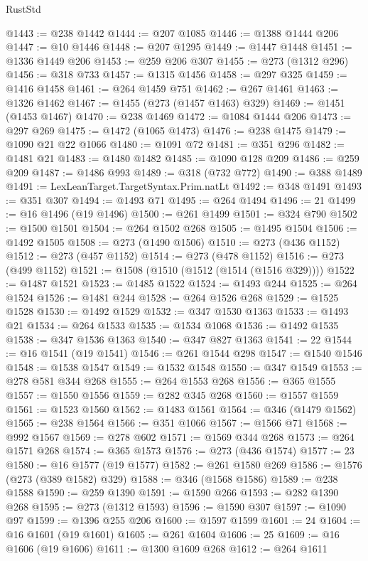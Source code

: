 \begin{lexlean}{RustStd}
\begin{coremodule}
{{{{{{{{{{{{{{{{{{{@1443 := @238 @1442
@1444 := @207 @1085
@1446 := @1388 @1444 @206
@1447 := @10 @1446
@1448 := @207 @1295
@1449 := @1447 @1448
@1451 := @1336 @1449 @206
@1453 := @259 @206 @307
@1455 := @273 (@1312 @296)
@1456 := @318 @733
@1457 := @1315 @1456
@1458 := @297 @325
@1459 := @1416 @1458
@1461 := @264 @1459 @751
@1462 := @267 @1461
@1463 := @1326 @1462
@1467 := @1455 (@273 (@1457 @1463) @329)
@1469 := @1451 (@1453 @1467)
@1470 := @238 @1469
@1472 := @1084 @1444 @206
@1473 := @297 @269
@1475 := @1472 (@1065 @1473)
@1476 := @238 @1475
@1479 := @1090 @21 @22 @1066
@1480 := @1091 @72
@1481 := @351 @296
@1482 := @1481 @21
@1483 := @1480 @1482
@1485 := @1090 @128 @209
@1486 := @259 @209
@1487 := @1486 @993
@1489 := @318 (@732 @772)
@1490 := @388 @1489
@1491 := LexLeanTarget.TargetSyntax.Prim.natLt
@1492 := @348 @1491
@1493 := @351 @307
@1494 := @1493 @71
@1495 := @264 @1494
@1496 := 21
@1499 := @16 @1496 (@19 @1496)
@1500 := @261 @1499
@1501 := @324 @790
@1502 := @1500 @1501
@1504 := @264 @1502 @268
@1505 := @1495 @1504
@1506 := @1492 @1505
@1508 := @273 (@1490 @1506)
@1510 := @273 (@436 @1152)
@1512 := @273 (@457 @1152)
@1514 := @273 (@478 @1152)
@1516 := @273 (@499 @1152)
@1521 := @1508 (@1510 (@1512 (@1514 (@1516 @329))))
@1522 := @1487 @1521
@1523 := @1485 @1522
@1524 := @1493 @244
@1525 := @264 @1524
@1526 := @1481 @244
@1528 := @264 @1526 @268
@1529 := @1525 @1528
@1530 := @1492 @1529
@1532 := @347 @1530 @1363
@1533 := @1493 @21
@1534 := @264 @1533
@1535 := @1534 @1068
@1536 := @1492 @1535
@1538 := @347 @1536 @1363
@1540 := @347 @827 @1363
@1541 := 22
@1544 := @16 @1541 (@19 @1541)
@1546 := @261 @1544 @298
@1547 := @1540 @1546
@1548 := @1538 @1547
@1549 := @1532 @1548
@1550 := @347 @1549
@1553 := @278 @581 @344 @268
@1555 := @264 @1553 @268
@1556 := @365 @1555
@1557 := @1550 @1556
@1559 := @282 @345 @268
@1560 := @1557 @1559
@1561 := @1523 @1560
@1562 := @1483 @1561
@1564 := @346 (@1479 @1562)
@1565 := @238 @1564
@1566 := @351 @1066
@1567 := @1566 @71
@1568 := @992 @1567
@1569 := @278 @602
@1571 := @1569 @344 @268
@1573 := @264 @1571 @268
@1574 := @365 @1573
@1576 := @273 (@436 @1574)
@1577 := 23
@1580 := @16 @1577 (@19 @1577)
@1582 := @261 @1580 @269
@1586 := @1576 (@273 (@389 @1582) @329)
@1588 := @346 (@1568 @1586)
@1589 := @238 @1588
@1590 := @259 @1390
@1591 := @1590 @266
@1593 := @282 @1390 @268
@1595 := @273 (@1312 @1593)
@1596 := @1590 @307
@1597 := @1090 @97
@1599 := @1396 @255 @206
@1600 := @1597 @1599
@1601 := 24
@1604 := @16 @1601 (@19 @1601)
@1605 := @261 @1604
@1606 := 25
@1609 := @16 @1606 (@19 @1606)
@1611 := @1300 @1609 @268
@1612 := @264 @1611
}}}}}}}}}}}}}}}}}}}
\end{coremodule}
\end{lexlean}
